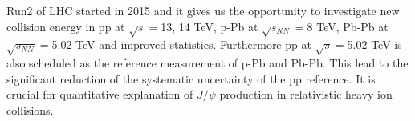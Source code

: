 

Run2 of LHC started in 2015 and it gives us the opportunity to investigate new collision energy in pp at $\sqrt{s}=$13, 14 TeV, p-Pb at $\sqrt{s_{NN}}=$8 TeV, Pb-Pb at $\sqrt{s_{NN}}=$5.02 TeV and improved statistics. 
Furthermore pp at $\sqrt{s}=$5.02 TeV is also scheduled as the reference measurement of p-Pb and Pb-Pb. 
This lead to the significant reduction of the systematic uncertainty of the pp reference. 
It is crucial for quantitative explanation of $J/\psi$ production in relativistic heavy ion collisions. 
